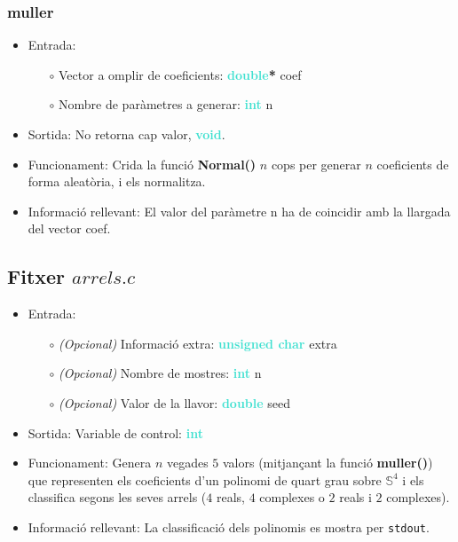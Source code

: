 \documentclass[a4paper, 11pt]{article}
\begin{document}
\subsubsection{muller}\label{muller}
\begin{itemize}
    \item Entrada: 
    \begin{itemize}
        \item[$\circ$] Vector a omplir de coeficients: \textbf{\textcolor{Turquoise}{double}}\textbf{\textcolor{deepmagenta}{*}} coef
        \item[$\circ$] Nombre de paràmetres a generar: \textbf{\textcolor{Turquoise}{int}} n
    \end{itemize}
    \item Sortida: No retorna cap valor, \textbf{\textcolor{Turquoise}{void}}.
    \item Funcionament: Crida la funció \textbf{\textcolor{funcblue}{Normal()}} $n$ cops per generar $n$ coeficients de forma aleatòria, i els normalitza.
    \item Informació rellevant: El valor del paràmetre n ha de coincidir amb la llargada del vector coef.
\end{itemize}
\subsection{Fitxer $arrels.c$}\label{arrelspuntc}
\begin{itemize}
    \item Entrada: 
    \begin{itemize}
        \item [$\circ$] \textit{(Opcional)} Informació extra: \textbf{\textcolor{Turquoise}{unsigned char}} extra
        \item [$\circ$] \textit{(Opcional)} Nombre de mostres: \textbf{\textcolor{Turquoise}{int}}  n
        \item [$\circ$] \textit{(Opcional)} Valor de la llavor: \textbf{\textcolor{Turquoise}{double}} seed
    \end{itemize}
    \item Sortida: Variable de control: \textbf{\textcolor{Turquoise}{int}}
    \item Funcionament: Genera $n$ vegades $5$ valors (mitjançant la funció \textbf{\textcolor{funcblue}{muller()}}) que representen els coeficients d'un polinomi de quart grau sobre $\mathbb{S}^4$ i els classifica segons les seves arrels ($4$ reals, $4$ complexes o $2$ reals i $2$ complexes).
    \item Informació rellevant: La classificació dels polinomis es mostra per \texttt{stdout}.
\end{itemize}
\end{document}
